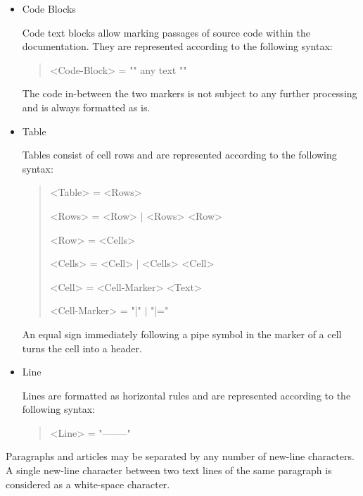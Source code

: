 \begin{itemize}
\item Code Blocks\nopagebreak

Code text blocks allow marking passages of source code within the documentation.
They are represented according to the following syntax:

\begin{quote}\begin{grammar}
<Code-Block> = "{{{" any text "}}}" \par
\end{grammar}\end{quote}

The code in-between the two markers is not subject to any further processing and is always formatted as is.

\item Table\nopagebreak

Tables consist of cell rows and are represented according to the following syntax:

\begin{quote}\begin{grammar}
<Table> = <Rows> \par
<Rows> = <Row> $\mid$ <Rows> <Row> \par
<Row> = <Cells> \par
<Cells> = <Cell> $\mid$ <Cells> <Cell> \par
<Cell> = <Cell-Marker> <Text> \par
<Cell-Marker> = "|" $\mid$ "|=" \par
\end{grammar}\end{quote}

An equal sign immediately following a pipe symbol in the marker of a cell turns the cell into a header.

\item Line\nopagebreak

Lines are formatted as horizontal rules and are represented according to the following syntax:

\begin{quote}\begin{grammar}
<Line> = "--------" \par
\end{grammar}\end{quote}

\end{itemize}

Paragraphs and articles may be separated by any number of new-line characters.
A single new-line character between two text lines of the same paragraph is considered as a white-space character.

